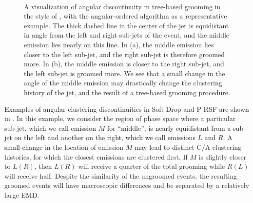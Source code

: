 \begin{figure}[t!]
      \centering
      ~~~~
\caption{
    A visualization of angular discontinuity in tree-based grooming in the style of , with the angular-ordered  algorithm as a representative example.
    The thick dashed line in the center of the jet is equidistant in angle from the left and right sub-jets of the event, and the middle emission lies nearly on this line.
    In (a), the middle emission lies closer to the left sub-jet, and the right sub-jet is therefore groomed more.
    In (b), the middle emission is closer to the right sub-jet, and the left sub-jet is groomed more.
    We see that a small change in the angle of the middle emission may drastically change the clustering history of the jet, and the result of a tree-based grooming procedure.
}
\label{fig:angdiscont}
\end{figure}


Examples of angular clustering discontinuities in Soft Drop and P-RSF are shown in .
%
In this example, we consider the region of phase space where a particular sub-jet, which we call emission \(M\) for ``middle'', is nearly equidistant from a sub-jet on the left and another on the right, which we call emissions \(L\) and \(R\).
%
A small change in the location of emission \(M\) may lead to distinct C/A clustering histories, for which the closest emissions are clustered first.
%
If \(M\) is slightly closer to \(L (R)\), then \(L (R)\) will receive a quarter of the total grooming while \(R (L)\) will receive half.
%
Despite the similarity of the ungroomed events, the resulting groomed events will have macroscopic differences and be separated by a relatively large EMD.

